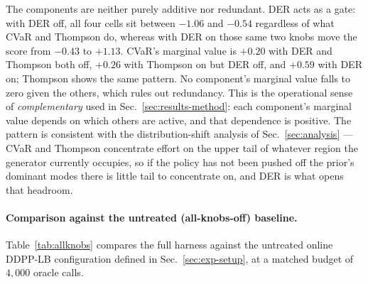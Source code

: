 \documentclass{article}
\begin{document}

The components are neither purely additive nor redundant. DER acts as a gate: with DER off, all four cells sit between $-1.06$ and $-0.54$ regardless of what CVaR and Thompson do, whereas with DER on those same two knobs move the score from $-0.43$ to $+1.13$. CVaR's marginal value is $+0.20$ with DER and Thompson both off, $+0.26$ with Thompson on but DER off, and $+0.59$ with DER on; Thompson shows the same pattern. No component's marginal value falls to zero given the others, which rules out redundancy. This is the operational sense of \emph{complementary} used in Sec.~\ref{sec:results-method}: each component's marginal value depends on which others are active, and that dependence is positive. The pattern is consistent with the distribution-shift analysis of Sec.~\ref{sec:analysis} --- CVaR and Thompson concentrate effort on the upper tail of whatever region the generator currently occupies, so if the policy has not been pushed off the prior's dominant modes there is little tail to concentrate on, and DER is what opens that headroom.

\paragraph{Comparison against the untreated (all-knobs-off) baseline.} Table~\ref{tab:allknobs} compares the full harness against the untreated online DDPP-LB configuration defined in Sec.~\ref{sec:exp-setup}, at a matched budget of $4{,}000$ oracle calls.
\end{document}
